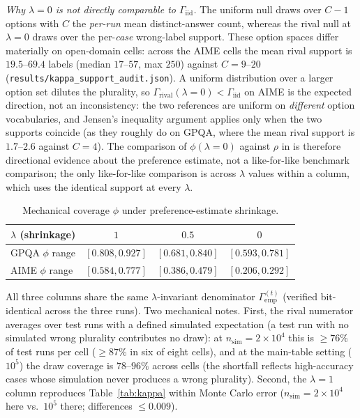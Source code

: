 \documentclass{article}
\newcommand{\agreementIndex}{\Gamma}
\begin{document}
\emph{Why $\lambda=0$ is not directly comparable to $\agreementIndex_{\mathrm{iid}}$.}
The uniform null draws over $C-1$ options with $C$ the \emph{per-run}
mean distinct-answer count, whereas the rival null at $\lambda=0$ draws
over the per-\emph{case} wrong-label support. These option spaces differ
materially on open-domain cells: across the AIME cells the mean rival
support is $19.5$--$69.4$ labels (median $17$--$57$, max $250$) against
$C=9$--$20$ (\texttt{results/kappa\_support\_audit.json}). A uniform
distribution over a larger option set dilutes the plurality, so
$\agreementIndex_{\mathrm{rival}}(\lambda=0)<\agreementIndex_{\mathrm{iid}}$ on AIME is
the expected direction, not an inconsistency: the two references are
uniform on \emph{different} option vocabularies, and Jensen's inequality
argument applies only when the two supports coincide (as they roughly do
on GPQA, where the mean rival support is $1.7$--$2.6$ against $C=4$).
The comparison of $\phi(\lambda=0)$ against $\rho$ in
 is therefore directional evidence about the preference estimate, not a
 like-for-like benchmark comparison; the only like-for-like comparison is
across $\lambda$ values within a column, which uses the identical support
at every $\lambda$.

\begin{table}[H]
\centering
\caption{Mechanical coverage $\phi$ under preference-estimate shrinkage.}
\label{tab:shrink}
\begin{tabular}{lccc}
\toprule
$\lambda$ (shrinkage) & $1$ & $0.5$ & $0$ \\
\midrule
GPQA $\phi$ range & $[0.808,0.927]$ & $[0.681,0.840]$ & $[0.593,0.781]$ \\
AIME $\phi$ range & $[0.584,0.777]$ & $[0.386,0.479]$ & $[0.206,0.292]$ \\
\bottomrule
\end{tabular}
\end{table}

All three columns share the same $\lambda$-invariant denominator
$\agreementIndex_{\mathrm{emp}}^{(t)}$ (verified bit-identical across the three
runs). Two mechanical notes. First, the rival numerator averages over
test runs with a defined simulated expectation (a test run with no
simulated wrong plurality contributes no draw): at
$n_{\mathrm{sim}}=2\times10^4$ this is $\ge76\%$ of test runs per cell ($\ge87\%$ in six of eight cells),
and at the main-table setting ($10^5$) the draw coverage is $78$--$96\%$ across cells (the shortfall reflects high-accuracy cases whose simulation never produces a wrong plurality). Second, the $\lambda=1$ column reproduces
Table~\ref{tab:kappa} within Monte Carlo error
($n_{\mathrm{sim}}=2\times10^4$ here vs.\ $10^5$ there; differences
$\le0.009$).
\end{document}
